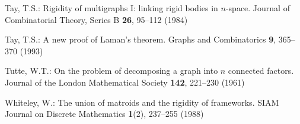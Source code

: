 \documentclass[Svgc,nospthms]{Svgc}
\begin{document}
\begin{thebibliography}{21}
Tay, T.S.: Rigidity of multigraphs {I}: linking rigid bodies in $n$-space.
\newblock Journal of Combinatorial Theory, Series B \textbf{26}, 95--112 (1984)

Tay, T.S.: A new proof of {L}aman's theorem.
\newblock Graphs and Combinatorics \textbf{9}, 365--370 (1993)

Tutte, W.T.: On the problem of decomposing a graph into $n$ connected factors.
\newblock Journal of the London Mathematical Society \textbf{142}, 221--230 (1961)

Whiteley, W.: The union of matroids and the rigidity of frameworks.
\newblock SIAM Journal on Discrete Mathematics \textbf{1}(2), 237--255 (1988)

\end{thebibliography}
\end{document}
